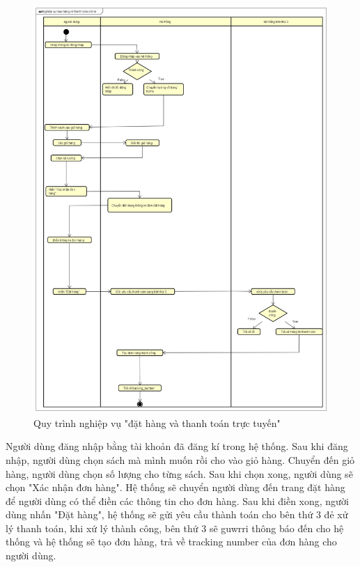 \documentclass[../DoAn.tex]{subfiles}
\begin{document}
\begin{figure}[H] %
\centering
\includegraphics[width=1\linewidth]{Hinhve/nghiệp vụ mua hàng và thanh toán online.png}
\caption{Quy trình nghiệp vụ "đặt hàng và thanh toán trực tuyến"}
\label{fig:UsecaseBook}
\end{figure}

Người dùng đăng nhập bằng tài khoản đã đăng kí trong hệ thống. Sau khi đăng nhập, người dùng chọn sách mà mình muốn rồi cho vào giỏ hàng. Chuyển đến giỏ hàng, người dùng chọn số lượng cho từng sách. Sau khi chọn xong, người dùng sẽ chọn "Xác nhận đơn hàng". Hệ thống sẽ chuyển người dùng đến trang đặt hàng để người dùng có thể điền các thông tin cho đơn hàng. Sau khi điền xong, người dùng nhấn "Đặt hàng", hệ thống sẽ gửi yêu cầu thành toán cho bên thứ 3 đẻ xử lý thanh toán, khi xứ lý thành công, bên thứ 3 sẽ guwrri thông báo đến cho hệ thống và hệ thống sẽ tạo đơn hàng, trả về tracking number của đơn hàng cho người dùng.
\end{document}
